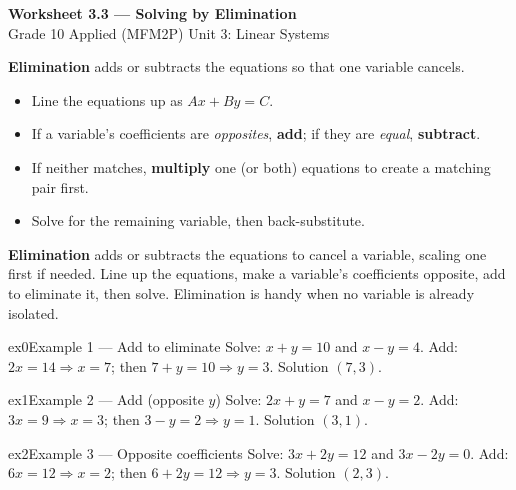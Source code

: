 \documentclass[11pt]{article}
\begin{document}
\begin{center}
{\LARGE\bfseries\color{titleblue}Worksheet 3.3 --- Solving by Elimination}\\[2pt]
{\small Grade 10 Applied (MFM2P) \textperiodcentered{} Unit 3: Linear Systems}
\end{center}

\begin{ideabox}
\textbf{Elimination} adds or subtracts the equations so that one variable cancels.
\begin{itemize}[leftmargin=*,itemsep=2pt]
  \item Line the equations up as $Ax+By=C$.
  \item If a variable's coefficients are \emph{opposites}, \textbf{add}; if they are \emph{equal}, \textbf{subtract}.
  \item If neither matches, \textbf{multiply} one (or both) equations to create a matching pair first.
  \item Solve for the remaining variable, then back-substitute.
\end{itemize}
\end{ideabox}

\begin{learnbox}
\textbf{Elimination} adds or subtracts the equations to cancel a variable, scaling one first if needed.
Line up the equations, make a variable's coefficients opposite, add to eliminate it, then solve.
Elimination is handy when no variable is already isolated.
\end{learnbox}


\begin{example}{ex0}{Example 1 --- Add to eliminate}
Solve: $x+y=10$ and $x-y=4$.
\soln Add: $2x=14\Rightarrow x=7$; then $7+y=10\Rightarrow y=3$. Solution $(7,3)$.
\end{example}

\begin{example}{ex1}{Example 2 --- Add (opposite $y$)}
Solve: $2x+y=7$ and $x-y=2$.
\soln Add: $3x=9\Rightarrow x=3$; then $3-y=2\Rightarrow y=1$. Solution $(3,1)$.
\end{example}

\begin{example}{ex2}{Example 3 --- Opposite coefficients}
Solve: $3x+2y=12$ and $3x-2y=0$.
\soln Add: $6x=12\Rightarrow x=2$; then $6+2y=12\Rightarrow y=3$. Solution $(2,3)$.
\end{example}
\end{document}
